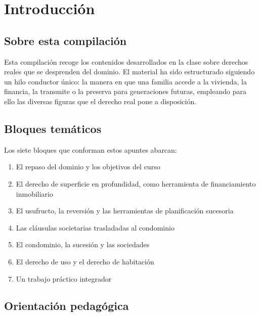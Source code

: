 \documentclass[12pt,oneside]{book}
\begin{document}

\tableofcontents


\chapter*{Introducción}

\section*{Sobre esta compilación}

Esta compilación recoge los contenidos desarrollados en la clase sobre derechos reales que se desprenden del dominio. El material ha sido estructurado siguiendo un hilo conductor único: la manera en que una familia accede a la vivienda, la financia, la transmite o la preserva para generaciones futuras, empleando para ello las diversas figuras que el derecho real pone a disposición.

\section*{Bloques temáticos}

Los siete bloques que conforman estos apuntes abarcan:

\begin{enumerate}
\item El repaso del dominio y los objetivos del curso
\item El derecho de superficie en profundidad, como herramienta de financiamiento inmobiliario
\item El usufructo, la reversión y las herramientas de planificación sucesoria
\item Las cláusulas societarias trasladadas al condominio
\item El condominio, la sucesión y las sociedades
\item El derecho de uso y el derecho de habitación
\item Un trabajo práctico integrador
\end{enumerate}

\section*{Orientación pedagógica}
\end{document}
